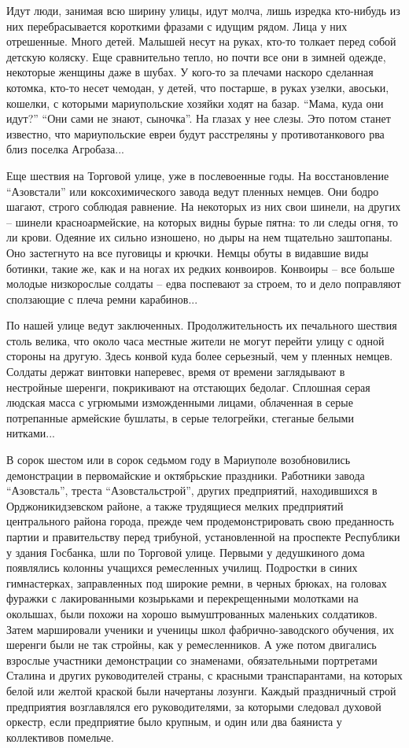 Идут люди, занимая всю ширину улицы, идут молча, лишь изредка кто-нибудь из них
перебрасывается короткими фразами с идущим рядом. Лица у них отрешенные. Много
детей. Малышей несут на руках, кто-то толкает перед собой детскую коляску. Еще
сравнительно тепло, но почти все они в зимней одежде, некоторые женщины даже в
шубах. У кого-то за плечами наскоро сделанная котомка, кто-то несет чемодан, у
детей, что постарше, в руках узелки, авоськи, кошелки, с которыми мариупольские
хозяйки ходят на базар. \enquote{Мама, куда они идут?} \enquote{Они сами не знают, сыночка}. На
глазах у нее слезы. Это потом станет известно, что мариупольские евреи будут
расстреляны у противотанкового рва близ поселка Агробаза...

Еще шествия на Торговой улице, уже в послевоенные годы. На восстановление
\enquote{Азовстали} или коксохимического завода ведут пленных немцев. Они бодро шагают,
строго соблюдая равнение. На некоторых из них свои шинели, на других – шинели
красноармейские, на которых видны бурые пятна: то ли следы огня, то ли крови.
Одеяние их сильно изношено, но дыры на нем тщательно заштопаны. Оно застегнуто
на все пуговицы и крючки. Немцы обуты в видавшие виды ботинки, такие же, как и
на ногах их редких конвоиров. Конвоиры – все больше молодые низкорослые солдаты
– едва поспевают за строем, то и дело поправляют сползающие с плеча ремни
карабинов...

По нашей улице ведут заключенных. Продолжительность их печального шествия столь
велика, что около часа местные жители не могут перейти улицу с одной стороны на
другую. Здесь конвой куда более серьезный, чем у пленных немцев. Солдаты держат
винтовки наперевес, время от времени заглядывают в нестройные шеренги,
покрикивают на отстающих бедолаг. Сплошная серая людская масса с угрюмыми
изможденными лицами, облаченная в серые потрепанные армейские бушлаты, в серые
телогрейки, стеганые белыми нитками... 

В сорок шестом или в сорок седьмом году в Мариуполе возобновились демонстрации
в первомайские и октябрьские праздники. Работники завода \enquote{Азовсталь}, треста
\enquote{Азовстальстрой}, других предприятий, находившихся в Орджоникидзевском районе,
а также трудящиеся мелких предприятий центрального района города, прежде чем
продемонстрировать свою преданность партии и правительству перед трибуной,
установленной на проспекте Республики у здания Госбанка, шли по Торговой улице.
Первыми у дедушкиного дома появлялись колонны учащихся ремесленных училищ.
Подростки в синих гимнастерках, заправленных под широкие ремни, в черных
брюках, на головах фуражки с лакированными козырьками и перекрещенными
молотками на околышах, были похожи на хорошо вымуштрованных маленьких
солдатиков. Затем маршировали ученики и ученицы школ фабрично-заводского
обучения, их шеренги были не так стройны, как у ремесленников. А уже потом
двигались взрослые участники демонстрации со знаменами, обязательными
портретами Сталина и других руководителей страны, с красными транспарантами, на
которых белой или желтой краской были начертаны лозунги. Каждый праздничный
строй предприятия возглавлялся его руководителями, за которыми следовал духовой
оркестр, если предприятие было крупным, и один или два баяниста у коллективов
помельче.

